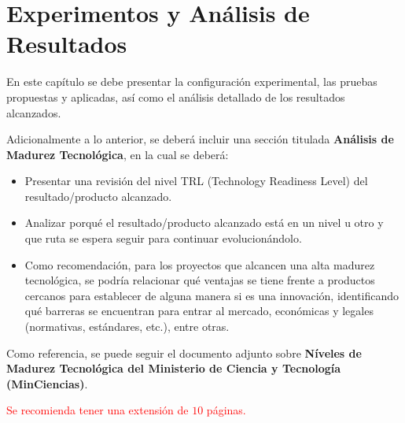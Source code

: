 \chapter{Experimentos y Análisis de Resultados}\label{experimentos}

En este capítulo se debe presentar la configuración experimental, las pruebas propuestas y aplicadas, así como el análisis detallado de los resultados alcanzados.

Adicionalmente a lo anterior, se deberá incluir una sección titulada \textbf{Análisis de Madurez Tecnológica}, en la cual se deberá:
\begin{itemize}
	\item Presentar una revisión del nivel TRL (Technology Readiness Level) del resultado/producto alcanzado. 
	\item Analizar porqué el resultado/producto alcanzado está en un nivel u otro y que ruta se espera seguir para continuar evolucionándolo.
	\item Como recomendación, para los proyectos que alcancen una alta madurez tecnológica, se podría relacionar qué ventajas se tiene frente a productos cercanos para establecer de alguna manera si es una innovación, identificando qué barreras se encuentran para entrar al mercado, económicas y legales (normativas, estándares, etc.), entre otras.
\end{itemize}

Como referencia, se puede seguir el documento adjunto sobre \textbf{Níveles de Madurez Tecnológica del Ministerio de Ciencia y Tecnología (MinCiencias)}.





\textcolor{red}{Se recomienda tener una extensión de $10$ páginas.}
